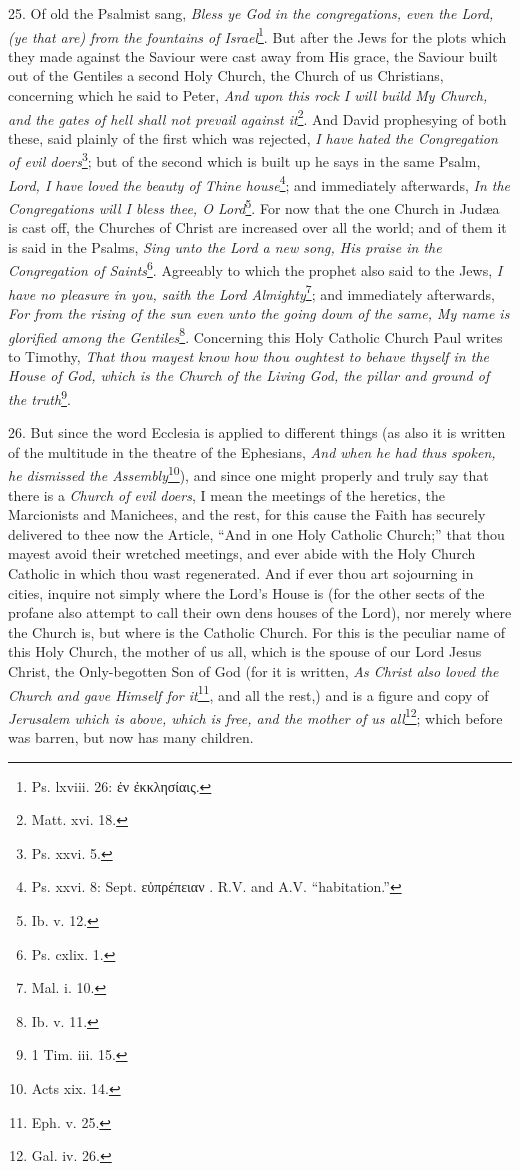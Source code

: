 25. Of old the Psalmist sang, \emph{Bless ye God in the congregations, even the Lord, (ye that are) from the fountains of Israel}\footnote{Ps. lxviii. 26: \textgreek{ἐν ἐκκλησίαις}.}. But after the Jews for the plots which they made against the Saviour were cast away from His grace, the Saviour built out of the Gentiles a second Holy Church, the Church of us Christians, concerning which he said to Peter, \emph{And upon this rock I will build My Church, and the gates of hell shall not prevail against it}\footnote{Matt. xvi. 18.}. And David prophesying of both these, said plainly of the first which was rejected, \emph{I have hated the Congregation of evil doers}\footnote{Ps. xxvi. 5.}; but of the second which is built up he says in the same Psalm, \emph{Lord, I have loved the beauty of Thine house}\footnote{Ps. xxvi. 8: Sept. \textgreek{εὐπρέπειαν} . \textsc{R.V.} and \textsc{A.V.} “habitation.”}; and immediately afterwards, \emph{In the Congregations will I bless thee, O Lord}\footnote{Ib. v. 12.}. For now that the one Church in Judæa is cast off, the Churches of Christ are increased over all the world; and of them it is said in the Psalms, \emph{Sing unto the Lord a new song, His praise in the Congregation of Saints}\footnote{Ps. cxlix. 1.}. Agreeably to which the prophet also said to the Jews, \emph{I have no pleasure in you, saith the Lord Almighty}\footnote{Mal. i. 10.}; and immediately afterwards, \emph{For from the rising of the sun even unto the going down of the same, My name is glorified among the Gentiles}\footnote{Ib. v. 11.}. Concerning this Holy Catholic Church Paul writes to Timothy, \emph{That thou mayest know how thou oughtest to behave thyself in the House of God, which is the Church of the Living God, the pillar and ground of the truth}\footnote{1 Tim. iii. 15.}.

26. But since the word Ecclesia is applied to different things (as also it is written of the multitude in the theatre of the Ephesians, \emph{And when he had thus spoken, he dismissed the Assembly}\footnote{Acts xix. 14.}), and since one might properly and truly say that there is a \emph{Church of evil doers}, I mean the meetings of the heretics, the Marcionists and Manichees, and the rest, for this cause the Faith has securely delivered to thee now the Article, “And in one Holy Catholic Church;” that thou mayest avoid their wretched meetings, and ever abide with the Holy Church Catholic in which thou wast regenerated. And if ever thou art sojourning in cities, inquire not simply where the Lord’s House is (for the other sects of the profane also attempt to call their own dens houses of the Lord), nor merely where the Church is, but where is the Catholic Church. For this is the peculiar name of this Holy Church, the mother of us all, which is the spouse of our Lord Jesus Christ, the Only-begotten Son of God (for it is written, \emph{As Christ also loved the Church and gave Himself for it}\footnote{Eph. v. 25.}, and all the rest,) and is a figure and copy of \emph{Jerusalem which is above, which is free, and the mother of us all}\footnote{Gal. iv. 26.}; which before was barren, but now has many children.

